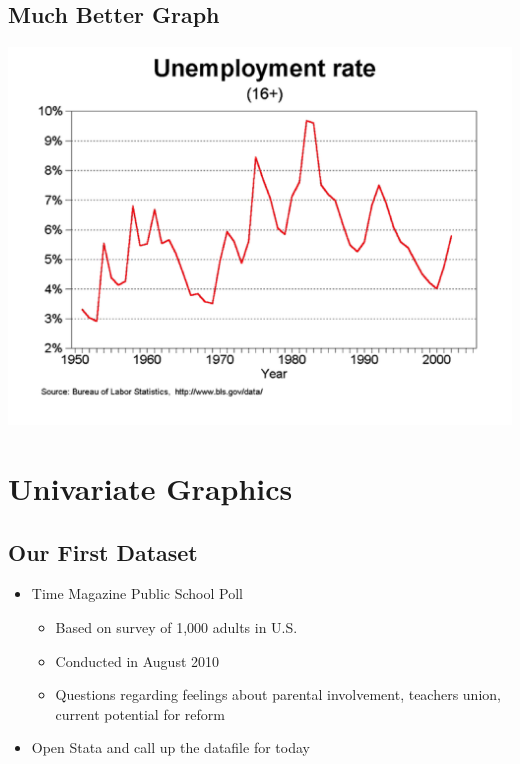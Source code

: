 \documentclass[
]{book}
\providecommand{\tightlist}{%
  \setlength{\itemsep}{0pt}\setlength{\parskip}{0pt}}
\begin{document}
\hypertarget{much-better-graph}{%
\subsection{Much Better Graph}\label{much-better-graph}}

\includegraphics{Stata/StataModGraph/images/Good.png}

\hypertarget{univariate-graphics}{%
\section{Univariate Graphics}\label{univariate-graphics}}

\hypertarget{our-first-dataset}{%
\subsection{Our First Dataset}\label{our-first-dataset}}

\begin{itemize}
\tightlist
\item
  Time Magazine Public School Poll

  \begin{itemize}
  \tightlist
  \item
    Based on survey of 1,000 adults in U.S.
  \item
    Conducted in August 2010
  \item
    Questions regarding feelings about parental involvement, teachers union, current potential for reform
  \end{itemize}
\item
  Open Stata and call up the datafile for today
\end{itemize}
\end{document}
